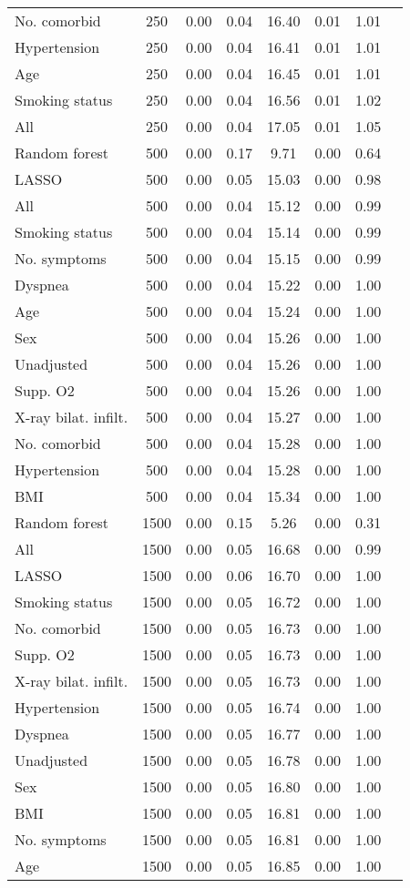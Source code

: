 \documentclass{article}
\begin{document}
{\begin{longtable}{lccccccc}
No. comorbid & 250 & 0.00 & 0.04 & 16.40 &  0.01 & 1.01 \\ 
Hypertension & 250 & 0.00 & 0.04 & 16.41 &  0.01 & 1.01 \\ 
Age & 250 & 0.00 & 0.04 & 16.45 &  0.01 & 1.01 \\ 
Smoking status & 250 & 0.00 & 0.04 & 16.56 &  0.01 & 1.02 \\ 
All & 250 & 0.00 & 0.04 & 17.05 &  0.01 & 1.05 \\ \midrule() 
Random forest & 500 & 0.00 & 0.17 &  9.71 &  0.00 & 0.64 \\ 
LASSO & 500 & 0.00 & 0.05 & 15.03 &  0.00 & 0.98 \\ 
All & 500 & 0.00 & 0.04 & 15.12 &  0.00 & 0.99 \\ 
Smoking status & 500 & 0.00 & 0.04 & 15.14 &  0.00 & 0.99 \\ 
No. symptoms & 500 & 0.00 & 0.04 & 15.15 &  0.00 & 0.99 \\ 
Dyspnea & 500 & 0.00 & 0.04 & 15.22 &  0.00 & 1.00 \\ 
Age & 500 & 0.00 & 0.04 & 15.24 &  0.00 & 1.00 \\ 
Sex & 500 & 0.00 & 0.04 & 15.26 &  0.00 & 1.00 \\ 
Unadjusted & 500 & 0.00 & 0.04 & 15.26 &  0.00 & 1.00 \\ 
Supp. O2 & 500 & 0.00 & 0.04 & 15.26 &  0.00 & 1.00 \\ 
X-ray bilat. infilt. & 500 & 0.00 & 0.04 & 15.27 &  0.00 & 1.00 \\ 
No. comorbid & 500 & 0.00 & 0.04 & 15.28 &  0.00 & 1.00 \\ 
Hypertension & 500 & 0.00 & 0.04 & 15.28 &  0.00 & 1.00 \\ 
BMI & 500 & 0.00 & 0.04 & 15.34 &  0.00 & 1.00 \\ \midrule() 
Random forest & 1500 & 0.00 & 0.15 &  5.26 &  0.00 & 0.31 \\ 
All & 1500 & 0.00 & 0.05 & 16.68 &  0.00 & 0.99 \\ 
LASSO & 1500 & 0.00 & 0.06 & 16.70 &  0.00 & 1.00 \\ 
Smoking status & 1500 & 0.00 & 0.05 & 16.72 &  0.00 & 1.00 \\ 
No. comorbid & 1500 & 0.00 & 0.05 & 16.73 &  0.00 & 1.00 \\ 
Supp. O2 & 1500 & 0.00 & 0.05 & 16.73 &  0.00 & 1.00 \\ 
X-ray bilat. infilt. & 1500 & 0.00 & 0.05 & 16.73 &  0.00 & 1.00 \\ 
Hypertension & 1500 & 0.00 & 0.05 & 16.74 &  0.00 & 1.00 \\ 
Dyspnea & 1500 & 0.00 & 0.05 & 16.77 &  0.00 & 1.00 \\ 
Unadjusted & 1500 & 0.00 & 0.05 & 16.78 &  0.00 & 1.00 \\ 
Sex & 1500 & 0.00 & 0.05 & 16.80 &  0.00 & 1.00 \\ 
BMI & 1500 & 0.00 & 0.05 & 16.81 &  0.00 & 1.00 \\ 
No. symptoms & 1500 & 0.00 & 0.05 & 16.81 &  0.00 & 1.00 \\ 
Age & 1500 & 0.00 & 0.05 & 16.85 &  0.00 & 1.00 \\
\bottomrule
\hline
\end{longtable}
}
\end{document}
